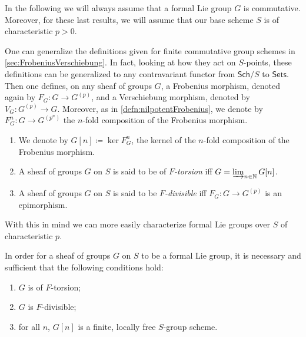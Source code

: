 \noindent
In the following we will always assume that a formal Lie group $G$
is commutative.
Moreover, for these last results, we will assume that
our base scheme $S$ is of characteristic $p  > 0$.


\begin{rem}
One can generalize the definitions given for finite commutative group schemes
in \cref{sec:FrobeniusVerschiebung}.
In fact, looking at how they act on $S$-points, these
definitions can be generalized to any contravariant functor
from $\mathsf{Sch}/S$ to $\mathsf{Sets}$.
Then one defines, on any sheaf of groups $G$, a Frobenius morphism,
denoted again by $F_G\colon G \to G^{(p)}$, 
and a Verschiebung morphism, denoted by $V_G \colon G^{(p)} \to G$.
Moreover, as in \cref{defn:nilpotentFrobenius}, we denote by
$F^n_G\colon G \to G^{(p^n)}$ the $n$-fold composition
of the Frobenius morphism.
\end{rem}


\begin{defn}[]\leavevmode\vspace{-\baselineskip}
\begin{enumerate}
\item We denote by $G[n] \coloneqq \ker F^n_G$, the kernel of the $n$-fold composition
	of the Frobenius morphism.

\item A sheaf of groups $G$ on $S$ is said to be of \emph{$F$-torsion} iff
	$G = \varinjlim_{n \in \mathbb{N}} G[n]$.

\item A sheaf of groups $G$ on $S$ is said to be \emph{$F$-divisible} iff
	$F_G\colon G \to G^{(p)}$ is an epimorphism.
\end{enumerate}
\end{defn}


\noindent
With this in mind we can more easily characterize formal Lie groups over
$S$ of characteristic $p$.
\begin{thm}\label{thm:MessingCharactLieGroup}
	In order for a sheaf of groups $G$ on $S$ to be a formal Lie group,
	it is necessary and sufficient that the following conditions hold:
\begin{enumerate}
	\item $G$ is of $F$-torsion;
	\item $G$ is $F$-divisible;
	\item for all \(n\), $G[n]$ is a finite, locally free $S$-group scheme.
\end{enumerate}
\end{thm}


